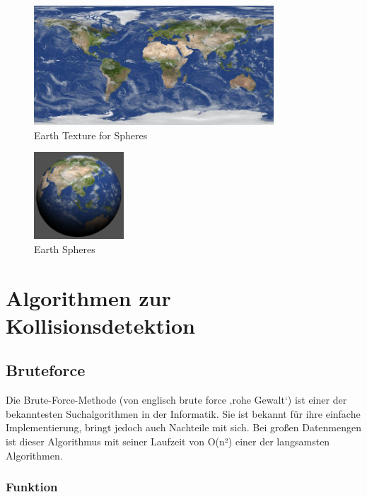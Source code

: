 \documentclass[12pt,a4paper]{article}
\begin{document}
		\begin{figure}[H]
			\centering 
			\includegraphics[width=0.8\textwidth]{../data/earth.png}  
			\caption{Earth Texture for Spheres} 
			\label{Bild: Earth}  
		\end{figure}
		
				\begin{figure}[H]
			\centering 
			\includegraphics[width=0.3\textwidth]{../data/Sphere.png}  
			\caption{Earth Spheres} 
			\label{Bild: Earth Sphere}  
		\end{figure}
		
		

		
	
	\section{Algorithmen zur Kollisionsdetektion}
	
\subsection{Bruteforce}

Die Brute-Force-Methode (von englisch brute force ‚rohe Gewalt‘) \cite{Bruteforce} ist einer der bekanntesten Suchalgorithmen in der Informatik. Sie ist bekannt für ihre einfache Implementierung, bringt jedoch auch Nachteile mit sich. Bei großen Datenmengen ist dieser Algorithmus mit seiner Laufzeit von  O(n²) einer der langsamsten Algorithmen.

\subsubsection{Funktion}
\end{document}
